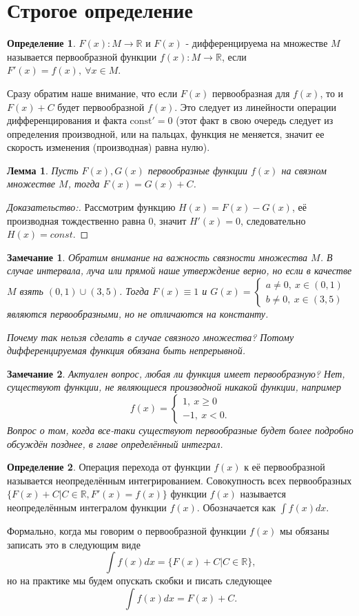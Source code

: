\documentclass{book} %
\newtheorem{lemma}{Лемма}[chapter] %
\newtheorem{notabene}{Замечание}[chapter]
\theoremstyle{definition}
\newtheorem{definition}{Определение}[chapter]
\theoremstyle{remark}
\begin{document}
	\section{Строгое определение}
		\begin{definition}
			$F(x): M \to \mathbb{R}$ и $F(x)$ - дифференцируема на множестве $M$ называется первообразной функции $f(x): M \to \mathbb{R}$, если $F'(x) = f(x), \ \forall x \in M$.
		\end{definition}
		Сразу обратим наше внимание, что если $F(x)$ первообразная для $f(x)$, то и $F(x) + C$ будет первообразной $f(x)$. Это следует из линейности операции дифференцирования и факта $\mathrm{const}' = 0$ (этот факт в свою очередь следует из определения производной, или на пальцах, функция не меняется, значит ее скорость изменения (производная) равна нулю).
		\begin{lemma}
			Пусть $F(x), G(x)$ первообразные функции $f(x)$ на связном множестве $M$, тогда $F(x) = G(x) + C$.
		\end{lemma}
		\begin{proof}[Доказательство:]
			Рассмотрим функцию $H(x) = F(x) - G(x)$, её производная тождественно равна 0, значит $H'(x) = 0$, следовательно $H(x) = const$.
		\end{proof}
		\begin{notabene}
			Обратим внимание на важность связности множества $M$. В случае интервала, луча или прямой наше утверждение верно, но если в качестве $M$ взять $(0,1) \cup (3,5)$. Тогда $F(x) \equiv 1$ и $G(x) = \begin{cases} a\neq0,\ x \in (0,1) \\ b\neq 0, \ x \in (3,5) \end{cases}$ являются первообразными, но не отличаются на константу.
			
			Почему так нельзя сделать в случае связного множества? Потому дифференцируемая функция обязана быть непрерывной.
		\end{notabene}
		\begin{notabene}
			Актуален вопрос, любая ли функция имеет первообразную? Нет, существуют функции, не являющиеся производной никакой функции, например
			$$
				f(x) = \begin{cases}
					1, \ x \geq 0 \\
					-1, \ x < 0.
				\end{cases}
			$$
			Вопрос о том, когда все-таки существуют первообразные будет более подробно обсуждён позднее, в главе определённый интеграл.
		\end{notabene}
		\begin{definition}
			 Операция перехода от функции $f(x)$ к её первообразной называется неопределённым интегрированием. Совокупность всех первообразных $\{F(x) + C \vert C \in \mathbb{R}, F'(x) = f(x)\}$ функции $f(x)$ называется неопределённым интегралом функции $f(x)$. Обозначается как $\int f(x) dx$.
		\end{definition}
		Формально, когда мы говорим о первообразной функции $f(x)$ мы обязаны записать это в следующим виде
		$$
		\int f(x) dx = \{F(x) + C \vert C \in \mathbb{R}\},
		$$
		но на практике мы будем опускать скобки и писать следующее
		$$
		\int f(x) dx = F(x) + C.
		$$
\end{document}
